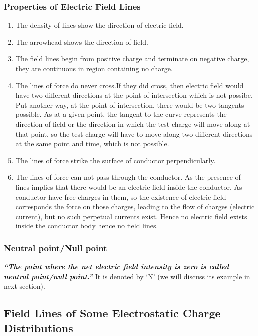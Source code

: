 \subsubsection{Properties of Electric Field Lines}
\begin{enumerate}[label=(\roman*)]
\item The density of lines show the direction of electric field.
\item The arrowhead shows the direction of field.
\item The field lines begin from positive charge and terminate on negative
charge, they are continuous in region containing no charge.
\item The lines of force do never cross.If they did cross,
then electric field would have two different directions at
the point of intersection which is not possibe.
Put another way, at the point of intersection,
there would be two tangents possible. As at a given point,
the tangent to the curve represents the direction of field or
the direction in which the test charge will move along at that point,
so the test charge will have to move along two different directions
at the same point and time, which is not possible.
\item The lines of force strike the surface of conductor perpendicularly.
\item The lines of force can not pass through the conductor. As the 
presence of lines implies that there would be an electric field
inside the conductor. As conductor have free charges in them,
so the existence of electric field corresponds the force on those charges,
leading to the flow of charges (electric current),
but no such perpetual currents exist. Hence no electric field exists
inside the conductor body hence no field lines.
\end{enumerate}
\subsubsection{Neutral point/Null point}
\textit{\textbf{“The point where the net electric field intensity
is zero is called neutral point/null point.”}}
It is denoted by ‘N’ (we will discuss its example in next section).
\subsection{Field Lines of Some Electrostatic Charge Distributions}
